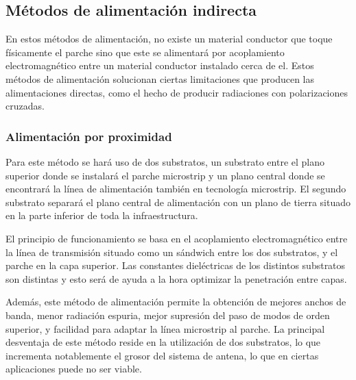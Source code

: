 \subsection{Métodos de alimentación indirecta}
\par En estos métodos de alimentación, no existe un material conductor que toque físicamente el parche sino que este se alimentará por acoplamiento electromagnético entre un material conductor instalado cerca de el. Estos métodos de alimentación solucionan ciertas limitaciones que producen las alimentaciones directas, como el hecho de producir radiaciones con polarizaciones cruzadas.

\subsubsection{Alimentación por proximidad}
\par Para este método se hará uso de dos substratos, un substrato entre el plano superior donde se instalará el parche microstrip y un plano central donde se encontrará la línea de alimentación también en tecnología microstrip. El segundo substrato separará el plano central de alimentación con un plano de tierra situado en la parte inferior de toda la infraestructura. 
\\
\par El principio de funcionamiento se basa en el acoplamiento electromagnético entre la línea de transmisión situado como un sándwich entre los dos substratos, y el parche en la capa superior.  Las constantes dieléctricas de los distintos substratos son distintas y esto será de ayuda a la hora optimizar la penetración entre capas.
\\
\par Además, este método de alimentación permite la obtención de mejores anchos de banda, menor radiación espuria, mejor supresión del paso de modos de orden superior, y facilidad para adaptar la línea microstrip al parche. La principal desventaja de este método reside en la utilización de dos substratos, lo que incrementa notablemente el grosor del sistema de antena, lo que en ciertas aplicaciones puede no ser viable.

